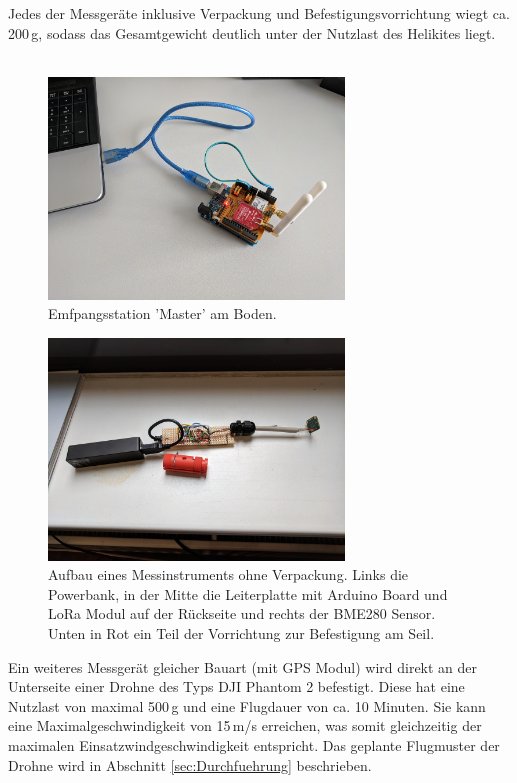 \documentclass[a4paper,11pt,DIV=calc,tablecaptionabove,headinclude,twoside]{article}
\begin{document}
Jedes der Messgeräte inklusive Verpackung und Befestigungsvorrichtung wiegt ca. 200\,g, sodass das Gesamtgewicht deutlich unter der Nutzlast des Helikites liegt.\\\\
\begin{figure}[t]
	\centering
	\includegraphics[width=0.7\textwidth]{Master.jpg}
	\captionsetup{width=11cm}
	\caption{Emfpangsstation 'Master' am Boden.}
	\label{Master}
\end{figure}
\begin{figure}[t]
	\centering
	\includegraphics[width=0.7\textwidth]{Slave.jpg}
	\captionsetup{width=11cm}
	\caption{Aufbau eines Messinstruments ohne Verpackung. Links die Powerbank, in der Mitte die Leiterplatte mit Arduino Board und LoRa Modul auf der Rückseite und rechts der BME280 Sensor. Unten in Rot ein Teil der Vorrichtung zur Befestigung am Seil.}
	\label{Slave}
\end{figure}
Ein weiteres Messgerät gleicher Bauart (mit GPS Modul) wird direkt an der Unterseite einer Drohne des Typs DJI Phantom 2 befestigt. Diese hat eine Nutzlast von maximal 500\,g und eine Flugdauer von ca. 10 Minuten. Sie kann eine Maximalgeschwindigkeit von 15\,m/s erreichen, was somit gleichzeitig der maximalen Einsatzwindgeschwindigkeit entspricht. Das geplante Flugmuster der Drohne wird in Abschnitt \ref{sec:Durchfuehrung} beschrieben. \\\\
\end{document}
